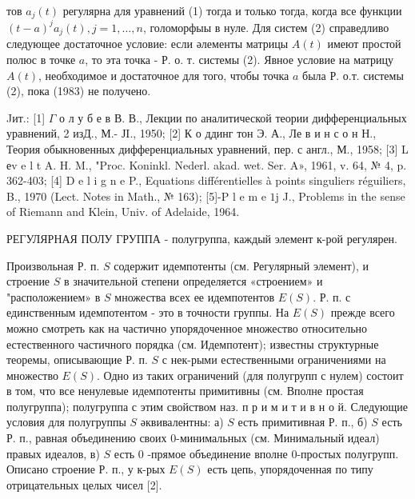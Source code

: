 \documentclass[10pt]{article}
\begin{document}
тов $a_{j}(t)$ регулярна для уравнений (1) тогда и только тогда, когда все функции $(t-a)^{j} a_{j}(t), j=1, \ldots, n$, голоморфыы в нуле. Для систем (2) справедливо следующее достаточное условие: если әлементы матрицы $A(t)$ имеют простой полюс в точке $a$, то эта точка - Р. о. т. системы (2). Явное условие на матрицу $A(t)$, необходимое и достаточное для того, чтобы точка $a$ была Р. о.т. системы (2), пока (1983) не получено.



Jит.: [1] $\Gamma$ о л у б е в В. В., Лекции по аналитической теории дифференциальных уравнений, 2 изД., М.- ЈI., 1950; [2] К о ддинг тон Э. А., Ле в и н с о н Н., Теория обыкновенных дифференциальных уравнений, пер. с англ., М., 1958; [3] L еv e l t A. H. M., "Proc. Koninkl. Nederl. akad. wet. Ser. A», 1961, v. 64, № 4, p. 362-403; [4] D e l i g n e P., Equations différentielles à points singuliers réguiliers, B., 1970 (Lect. Notes in Math., № 163); [5]-P l e m e $1 \mathrm{j}$ J., Problems in the sense of Riemann and Klein, Univ. of Adelaide, 1964.



РЕГУЛЯРНАЯ ПОЛУ ГРУППА - полугруппа, каждый элемент к-рой регулярен.



Произвольная Р. п. $S$ содержит идемпотенты (см. Регулярный элемент), и строение $S$ в значительной степени определяется «строением» и "расположением» в $S$ множества всех ее идемпотентов $E(S)$. Р. п. с единственным идемпотентом - это в точности группы. На $E(S)$ прежде всего можно смотреть как на частично упорядоченное множество относительно естественного частичного порядка (см. Идемпотент); известны структурные теоремы, описывающие Р. п. $S$ с нек-рыми естественными ограничениями на множество $E(S)$. Одно из таких ограничений (для полугрупп с нулем) состоит в том, что все ненулевые идемпотенты примитивны (см. Вполне простая полугруппа); полугруппа с этим свойством наз. п р и м и т и в н о й. Следующие условия для полугруппы $S$ әквивалентны: а) $S$ есть примитивная Р. п., б) $S$ есть Р. п., равная объединению своих 0-минимальных (см. Минимальный идеал) правых идеалов, в) $S$ есть 0 -прямое объединение вполне 0-простых полугрупп. Описано строение Р. п., у к-рых $E(S)$ есть цепь, упорядоченная по типу отрицательных целых чисел [2].
\end{document}
